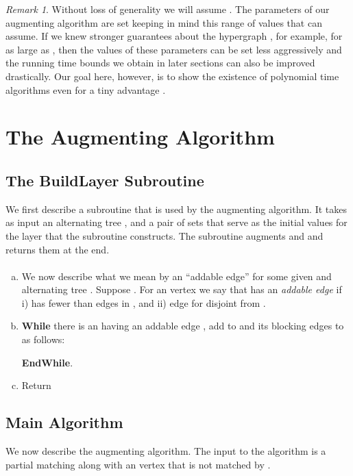 \documentclass[11pt]{article}
\theoremstyle{definition}
\theoremstyle{remark}
\newtheorem{remark}[theorem]{Remark}
\begin{document}
\begin{remark}
  Without loss of generality we will assume . The
  parameters  of our augmenting algorithm are set keeping in
  mind this range of values that  can assume. If we knew
  stronger guarantees about the hypergraph , for example, for
   as large as , then the values of these parameters
  can be set less aggressively and the running time bounds we obtain
  in later sections can also be improved drastically. Our goal here,
  however, is to show the existence of polynomial time algorithms even
  for a tiny advantage .
\end{remark}

\section{The Augmenting Algorithm}\label{section:augmenting}
\subsection{The BuildLayer Subroutine}\label{section:augmenting1}
We first describe a subroutine  that is used by the
augmenting algorithm. It takes as input an alternating tree , and a
pair of sets  that serve as the initial values for
the layer that the subroutine constructs. The subroutine augments 
and  and returns them at the end.

\paragraph{}
\begin{enumerate}[(a)]
\item We now describe what we mean by an ``addable edge'' for some
  given  and alternating tree . Suppose . For an  vertex
   we say that  has an \emph{addable
    edge} if i)  has fewer than  edges in , and ii)
   edge  for  disjoint from
  .
\item
    \textbf{While} there is an  having an
    addable edge , add  to  and its blocking
    edges to  as follows:
    
    \textbf{EndWhile}.
\item Return 
\end{enumerate}

\subsection{Main Algorithm}\label{section:augmenting2}

We now describe the augmenting algorithm. The input to the algorithm
is a partial matching  along with an  vertex  that is not
matched by .
\end{document}
